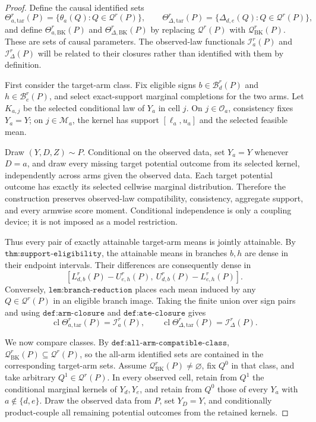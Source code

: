 \documentclass{article}
\begin{document}
\begin{proof}
Define the causal identified sets
\[
 \Theta_{a,\mathrm{tar}}^r(P)=\{\theta_a(Q):Q\in\mathcal Q^r(P)\},\qquad
 \Theta_{\Delta,\mathrm{tar}}^r(P)=\{\Delta_{d,e}(Q):Q\in\mathcal Q^r(P)\}, \tag{25}
\]
and define \(\Theta_{a,\mathrm{BK}}^r(P)\) and \(\Theta_{\Delta,\mathrm{BK}}^r(P)\) by replacing \(\mathcal Q^r(P)\) with \(\mathcal Q_{\mathrm{BK}}^r(P)\).  These are sets of causal parameters.  The observed-law functionals \(\mathcal I_a^r(P)\) and \(\mathcal I_\Delta^r(P)\) will be related to their closures rather than identified with them by definition.

First consider the target-arm class.  Fix eligible signs \(b\in\mathcal B_d^r(P)\) and \(h\in\mathcal B_e^r(P)\), and select exact-support marginal completions for the two arms.  Let \(K_{a,j}\) be the selected conditional law of \(Y_a\) in cell \(j\).  On \(j\in\mathcal O_a\), consistency fixes \(Y_a=Y\); on \(j\in\mathcal M_a\), the kernel has support \([\ell_a,u_a]\) and the selected feasible mean.

Draw \((Y,D,Z)\sim P\).  Conditional on the observed data, set \(Y_a=Y\) whenever \(D=a\), and draw every missing target potential outcome from its selected kernel, independently across arms given the observed data.  Each target potential outcome has exactly its selected cellwise marginal distribution.  Therefore the construction preserves observed-law compatibility, consistency, aggregate support, and every armwise score moment.  Conditional independence is only a coupling device; it is not imposed as a model restriction.

Thus every pair of exactly attainable target-arm means is jointly attainable.  By \(\texttt{thm:support-eligibility}\), the attainable means in branches \(b,h\) are dense in their endpoint intervals.  Their differences are consequently dense in
\[
 [L_{d,b}^r(P)-U_{e,h}^r(P),\ U_{d,b}^r(P)-L_{e,h}^r(P)].                     \tag{26}
\]
Conversely, \(\texttt{lem:branch-reduction}\) places each mean induced by any \(Q\in\mathcal Q^r(P)\) in an eligible branch image.  Taking the finite union over sign pairs and using \(\texttt{def:arm-closure}\) and \(\texttt{def:ate-closure}\) gives
\[
 \operatorname{cl}\Theta_{a,\mathrm{tar}}^r(P)=\mathcal I_a^r(P),
 \qquad
 \operatorname{cl}\Theta_{\Delta,\mathrm{tar}}^r(P)=\mathcal I_\Delta^r(P). \tag{27}
\]

We now compare classes.  By \(\texttt{def:all-arm-compatible-class}\),
\(\mathcal Q_{\mathrm{BK}}^r(P)\subseteq\mathcal Q^r(P)\), so the all-arm identified sets are contained in the corresponding target-arm sets.  Assume \(\mathcal Q_{\mathrm{BK}}^r(P)\ne\varnothing\), fix \(Q^0\) in that class, and take arbitrary \(Q^1\in\mathcal Q^r(P)\).  In every observed cell, retain from \(Q^1\) the conditional marginal kernels of \(Y_d,Y_e\), and retain from \(Q^0\) those of every \(Y_a\) with \(a\notin\{d,e\}\).  Draw the observed data from \(P\), set \(Y_D=Y\), and conditionally product-couple all remaining potential outcomes from the retained kernels.


\end{proof}
\end{document}
